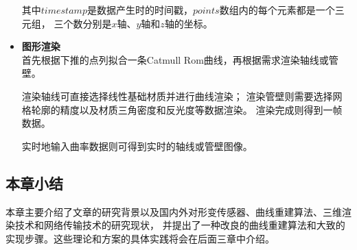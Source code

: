 \begin{itemize}
其中$timestamp$是数据产生时的时间戳，$points$数组内的每个元素都是一个三元组，
三个数分别是$x$轴、$y$轴和$z$轴的坐标。

\item \textbf{图形渲染} \\

首先根据下推的点列拟合一条Catmull Rom曲线，再根据需求渲染轴线或管壁。

渲染轴线可直接选择线性基础材质并进行曲线渲染；
渲染管壁则需要选择网格轮廓的精度以及材质三角密度和反光度等数据渲染。
渲染完成则得到一帧数据。

实时地输入曲率数据则可得到实时的轴线或管壁图像。

\end{itemize}

\subsection{本章小结}
本章主要介绍了文章的研究背景以及国内外对形变传感器、曲线重建算法、三维渲染技术和网络传输技术的研究现状，
并提出了一种改良的曲线重建算法和大致的实现步骤。这些理论和方案的具体实践将会在后面三章中介绍。
